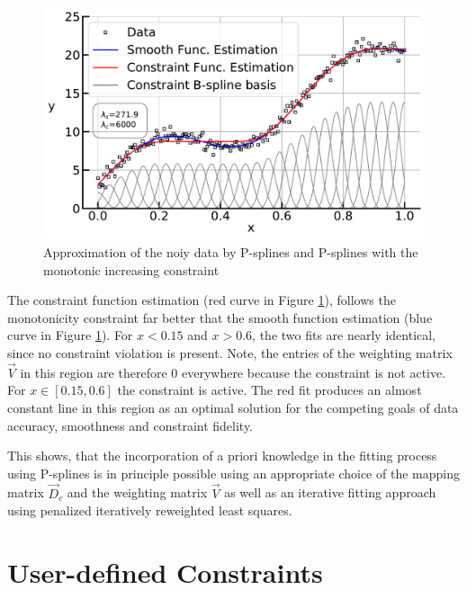 \documentclass[10pt,a4paper]{report}
\begin{document}
\begin{figure}[H]
	\centering
	\includegraphics[width=\linewidth]{../thesisplots/inc_spline.pdf}
	\caption{Approximation of the noiy data by P-splines and P-splines with the monotonic increasing constraint}
	\label{fig:incspline}
\end{figure}	

The constraint function estimation (red curve in Figure \ref{fig:incspline}), follows the monotonicity constraint far better that the smooth function estimation (blue curve in Figure \ref{fig:incspline}). For $x < 0.15$ and $x > 0.6$, the two fits are nearly identical, since no constraint violation is present. Note, the entries of the weighting matrix $\vec{V}$ in this region are therefore $0$ everywhere because the constraint is not active. For $x \in [0.15, 0.6]$ the constraint is active. The red fit produces an almost constant line in this region as an optimal solution for the competing goals of data accuracy, smoothness and constraint fidelity.

This shows, that the incorporation of a priori knowledge in the fitting process using P-splines is in principle possible using an appropriate choice of the mapping matrix $\vec{D}_c$ and the weighting matrix $\vec{V}$ as well as an iterative fitting approach using penalized iteratively reweighted least squares. 

\section{User-defined Constraints} \label{sec:user-defined-constraints}
\end{document}

